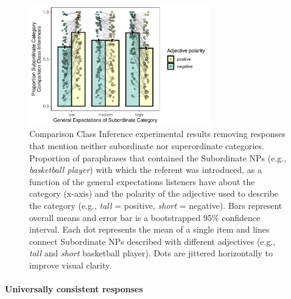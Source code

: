\documentclass[doc]{apa6}
\begin{document}
\begin{figure}[t]
\centering
\includegraphics[width=0.7\textwidth]{figs/bars_cc_finalExpt_prereg_bars_exactMatch_syncDodge.pdf}
\caption{Comparison Class Inference experimental results removing responses that mention neither subordinate nor superordinate categories. Proportion of paraphrases that contained the Subordinate NPs (e.g., \emph{basketball player}) with which the referent was introduced, as a function of the general expectations listeners have about the category (x-axis) and the polarity of the adjective used to describe the category (e.g., \emph{tall} = positive, \emph{short} = negative). Bars represent overall means and error bar is a bootstrapped 95\% confidence interval. Each dot represents the mean of a single item and lines connect Subordinate NPs described with different adjectives (e.g., \emph{tall} and \emph{short} basketball player). Dots are jittered horizontally to improve visual clarity.}\label{fig:ccInferenceMain2}
\end{figure}


\paragraph{Universally consistent responses}
\end{document}
